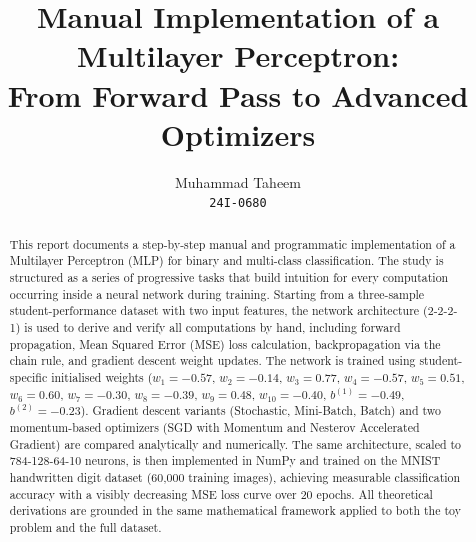 \documentclass[runningheads]{llncs}
\begin{document}
\title{Manual Implementation of a Multilayer Perceptron:\\
From Forward Pass to Advanced Optimizers}

\author{Muhammad Taheem\orcidID{} \\
\texttt{24I-0680}}



\maketitle

\begin{abstract}
This report documents a step-by-step manual and programmatic implementation of a
Multilayer Perceptron (MLP) for binary and multi-class classification. The study
is structured as a series of progressive tasks that build intuition for every
computation occurring inside a neural network during training. Starting from a
three-sample student-performance dataset with two input features, the network
architecture (2-2-2-1) is used to derive and verify all computations by hand,
including forward propagation, Mean Squared Error (MSE) loss calculation,
backpropagation via the chain rule, and gradient descent weight updates. The
network is trained using student-specific initialised weights ($w_1{=}{-}0.57$,
$w_2{=}{-}0.14$, $w_3{=}0.77$, $w_4{=}{-}0.57$, $w_5{=}0.51$, $w_6{=}0.60$,
$w_7{=}{-}0.30$, $w_8{=}{-}0.39$, $w_9{=}0.48$, $w_{10}{=}{-}0.40$,
$b^{(1)}{=}{-}0.49$, $b^{(2)}{=}{-}0.23$). Gradient descent variants
(Stochastic, Mini-Batch, Batch) and two momentum-based optimizers (SGD with
Momentum and Nesterov Accelerated Gradient) are compared analytically and
numerically. The same architecture, scaled to 784-128-64-10 neurons, is then
implemented in NumPy and trained on the MNIST handwritten digit dataset
(60{,}000 training images), achieving measurable classification accuracy with a
visibly decreasing MSE loss curve over 20 epochs. All theoretical derivations
are grounded in the same mathematical framework applied to both the toy problem
and the full dataset.
\end{abstract}
\end{document}
